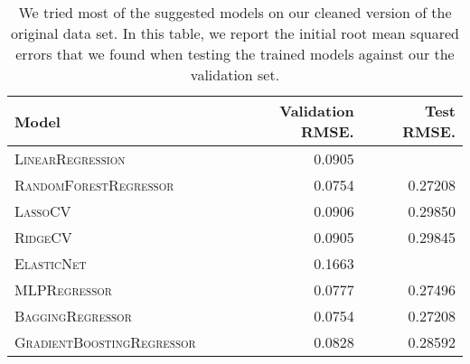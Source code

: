 \documentclass[12pt]{article}
\begin{document}
\begin{table}
\centering
\begin{tabular}{llrr}
 \toprule
 Model &  & Validation RMSE. & Test RMSE.\\
 \midrule
 \textsc{LinearRegression} & & 0.0905 &\\
 \textsc{RandomForestRegressor} & & 0.0754 & 0.27208\\
 \textsc{LassoCV} & & 0.0906  & 0.29850\\
 \textsc{RidgeCV} & &0.0905 & 0.29845\\
 \textsc{ElasticNet} & & 0.1663 & \\
 \textsc{MLPRegressor} & & 0.0777 & 0.27496\\
 \textsc{BaggingRegressor} & & 0.0754 & 0.27208\\
 \textsc{GradientBoostingRegressor} & & 0.0828 & 0.28592\\
 
 \bottomrule
\end{tabular}
\caption{\label{tab:results} We tried most of the suggested models on our cleaned version of the original data set. In this table, we report the initial root mean squared errors that we found when testing the trained models against our the validation set.}
\end{table}
\end{document}
